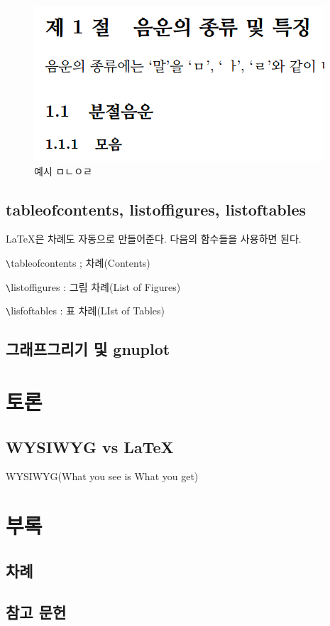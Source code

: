 \documentclass[11pt]{article}
\begin{document}
\begin{figure}
	\begin{center}
		\includegraphics{section_subsection_subsubsection.png}
	\end{center}
	\caption{예시 ㅁㄴㅇㄹ}
	\label{section}
\end{figure}

\subsection{tableofcontents, listoffigures, listoftables}
\LaTeX 은 차례도 자동으로 만들어준다. 다음의 함수들을 사용하면 된다.

\begin{center}
\verb+\+tableofcontents ; 차례(Contents)
	
\verb+\+listoffigures : 그림 차례(List of Figures)
	
\verb+\+lisfoftables : 표 차례(LIst of Tables)
\end{center}


\subsection{그래프그리기 및 gnuplot}

\section{토론}

\subsection{WYSIWYG vs LaTeX}
WYSIWYG(What you see is What you get)

\section{부록}

\subsection{차례}

\tableofcontents
\listoffigures
\listoftables

\subsection{참고 문헌}
\begin{thebibliography}{00}
\end{thebibliography}
\end{document}
